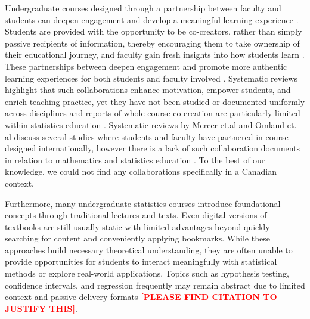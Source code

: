 \documentclass[11pt]{article}
\begin{document}
Undergraduate courses designed through a partnership between faculty and students can deepen engagement and develop a meaningful learning experience \cite{Healey2016,Bovill2019}. 
Students are provided with the opportunity to be co-creators, rather than simply passive recipients of information, thereby encouraging them to take ownership of their educational journey, and faculty gain fresh insights into how students learn \cite{Healey2016}.
These partnerships between deepen engagement and promote more authentic learning experiences for both students and faculty involved \cite{Healey2016,Bengtson2013}.
Systematic reviews highlight that such collaborations enhance motivation, empower students, and enrich teaching practice, yet they have not been studied or documented uniformly across disciplines \cite{MercerMapstone2017,Bovill2019} and reports of whole-course co-creation are particularly limited within statistics education \cite{Kim2022}. 
Systematic reviews by Mercer et.al \cite{MercerMapstone2017} and Omland et. al discuss several studies where students and faculty have partnered in course designed internationally, however there is a lack of such collaboration documents in relation to mathematics and statistics education \cite{Duah2011}.
To the best of our knowledge, we could not find any collaborations specifically in a Canadian context.

Furthermore, many undergraduate statistics courses introduce foundational concepts through traditional lectures and texts. 
Even digital versions of textbooks are still usually static with limited advantages beyond quickly searching for content and conveniently applying bookmarks.
While these approaches build necessary theoretical understanding, they are often unable to provide opportunities for students to interact meaningfully with statistical methods or explore real-world applications. 
Topics such as hypothesis testing, confidence intervals, and regression frequently may remain abstract due to limited context and passive delivery formats  
\colorbox{yellow!34}{\textcolor{red}{\textbf{[PLEASE FIND CITATION TO JUSTIFY THIS]}}}.
\end{document}

